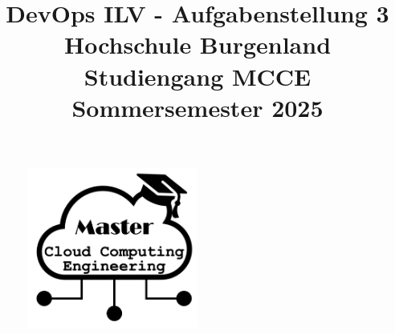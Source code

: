 \begin{figure}
    \centering
    \includegraphics[width=0.5\textwidth]{fig/Fig1.png}
    \label{fig:title-image}
\end{figure}


\title{
    DevOps ILV - Aufgabenstellung 3 \\
    \vspace{0.5cm}
    \large{Hochschule Burgenland} \\
    \large{Studiengang MCCE} \\
    \large{Sommersemester 2025}
}
